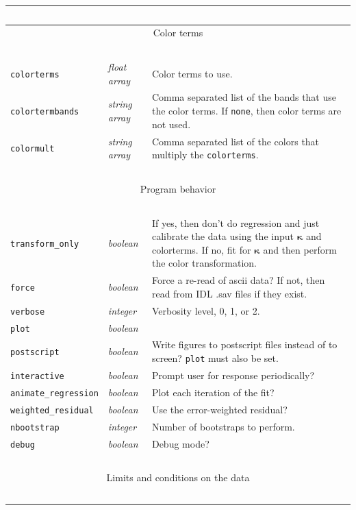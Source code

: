 \documentclass{report}
\newcommand{\zptcolor}{\boldsymbol{\kappa}}
\begin{document}
\begin{center}
\begin{longtable}{llp{2in}}
~ & ~ & ~ \\ \hline
\multicolumn{3}{c}{Color terms} \\
\hline ~ & ~ & ~ \\ 

\verb|colorterms| & {\it float array} & Color terms to use. \\
\verb|colortermbands| & {\it string array} & Comma separated list of the bands that use the color terms. If {\tt none}, then color terms are not used. \\
\verb|colormult| & {\it string array} & Comma separated list of the colors that multiply the \verb|colorterms|. \\

~ & ~ & ~ \\ \hline
\multicolumn{3}{c}{Program behavior} \\
\hline ~ & ~ & ~ \\ 

\verb|transform_only| & {\it boolean} & If yes, then don't do regression and just calibrate the data using the input $\zptcolor$ and colorterms.  If no, fit for $\zptcolor$ and then perform the color transformation. \\
\verb|force| & {\it boolean} & Force a re-read of ascii data? If not, then read from IDL .sav files if they exist.  \\
\verb|verbose| & {\it integer} & Verbosity level, 0, 1, or 2.  \\
\verb|plot| & {\it boolean} &  \\
\verb|postscript| & {\it boolean} & Write figures to postscript files instead of to screen? \verb|plot| must also be set.  \\
\verb|interactive| & {\it boolean} & Prompt user for response periodically? \\
\verb|animate_regression| & {\it boolean} & Plot each iteration of the fit? \\
\verb|weighted_residual| & {\it boolean} & Use the error-weighted residual? \\
\verb|nbootstrap| & {\it integer} & Number of bootstraps to perform. \\
\verb|debug| & {\it boolean} & Debug mode? \\

~ & ~ & ~ \\ \hline
\multicolumn{3}{c}{Limits and conditions on the data} \\
\hline ~ & ~ & ~ \\ 


\end{longtable}
\end{center}
\end{document}
